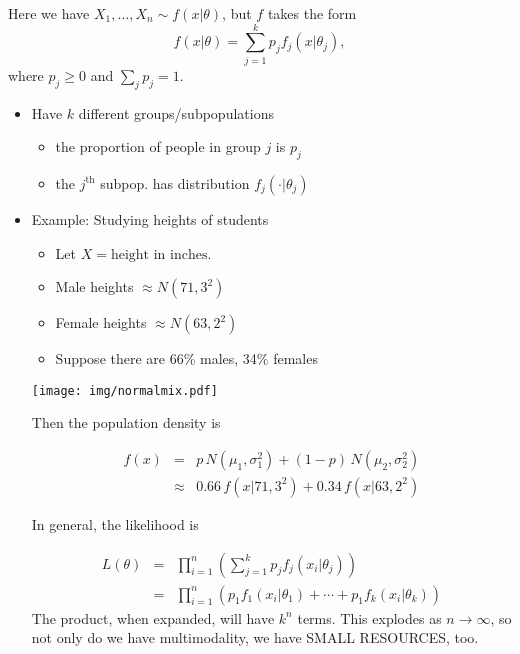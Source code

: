 \documentclass[captions=tableheading]{scrbook}
\begin{document}
Here we have \(X_{1},\ldots, X_{n} \sim f(x|\theta)\), but $f$ takes the form
\[
f(x|\theta) = \sum_{j=1}^{k}p_{j}f_{j}(x|\theta_{j}),
\]
where $p_{j}\geq 0$ and \(\sum_{j}p_{j}=1\).


\begin{itemize}
\item Have $k$ different groups/subpopulations
\begin{itemize}
\item the proportion of people in group $j$ is $p_{j}$
\item the $j^{\mathrm{th}}$ subpop. has distribution $f_{j}(\cdot |\theta_{j})$
\end{itemize}
\end{itemize}
\begin{itemize}

\item Example: Studying heights of students\\
\label{sec-1_2_3_1}%
\begin{itemize}
\item Let \(X = \mbox{height in inches}  \).
\item Male heights $\approx N(71, 3^2)$
\item Female heights $\approx N(63, 2^2)$
\item Suppose there are 66\% males, 34\% females
\end{itemize}

\begin{center}

\texttt{[image: img/normalmix.pdf]}

\end{center}

Then the population density is 

\begin{eqnarray*}
f(x) & = & p\,N(\mu_{1},\sigma_{1}^{2}) + (1 - p)\,N(\mu_{2},\sigma_{2}^{2})\\
     & \approx & 0.66\,f(x|71, 3^{2}) + 0.34\,f(x|63,2^{2})
\end{eqnarray*}

In general, the likelihood is 

\begin{eqnarray*}
L(\theta) & = & \prod_{i=1}^{n} \left( \sum_{j=1}^{k}p_{j}f_{j}(x_{i}|\theta_{j}) \right) \\
     & = & \prod_{i=1}^{n} \left( p_{1}f_{1}(x_{i}|\theta_{1}) + \cdots + p_{1}f_{k}(x_{i}|\theta_{k}) \right)
\end{eqnarray*}
The product, when expanded, will have $k^{n}$ terms.  This explodes as $n \to \infty$, so not only do we have multimodality, we have SMALL RESOURCES, too.

\end{itemize} %
\end{document}
